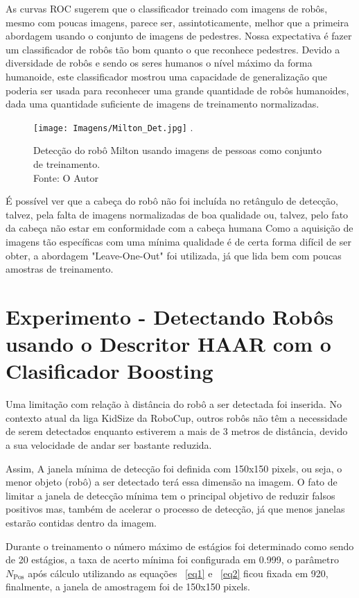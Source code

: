 As curvas ROC sugerem que o classificador treinado com imagens de robôs, mesmo com poucas imagens, parece ser, assintoticamente, melhor que a primeira abordagem usando o conjunto de imagens de pedestres. Nossa expectativa é fazer um classificador de robôs tão bom quanto o que reconhece pedestres. Devido a diversidade de robôs e sendo os seres humanos o nível máximo da forma humanoide, este classificador mostrou uma capacidade de generalização que poderia ser usada para reconhecer uma grande quantidade de robôs humanoides, dada uma quantidade suficiente de imagens de treinamento normalizadas.

\begin{figure}[!hH]
\centering
\texttt{[image: Imagens/Milton\_Det.jpg]}
\DeclareGraphicsExtensions.
\caption{Detecção do robô Milton usando imagens de pessoas como conjunto de treinamento. \\ Fonte: O Autor}
\label{Fig:Miltondet}
\end{figure} 

É possível ver que a cabeça do robô não foi incluída no retângulo de detecção, talvez, pela falta de imagens normalizadas de boa qualidade ou, talvez, pelo fato da cabeça não estar em conformidade com a cabeça humana
Como a aquisição de imagens tão específicas com uma mínima qualidade é de certa forma difícil de ser obter, a abordagem "Leave-One-Out" foi utilizada, já que lida bem com poucas amostras de treinamento.


\pagebreak

\section{Experimento - Detectando Robôs usando o Descritor HAAR com o Clasificador Boosting}
\label{HAAR-Boosting}
Uma limitação com relação à distância do robô a ser detectada foi inserida. No contexto atual da liga KidSize da RoboCup, outros robôs não têm a necessidade de serem detectados enquanto estiverem a mais de 3 metros de distância, devido a sua velocidade de andar ser bastante reduzida. 

Assim, A janela mínima de detecção foi definida com 150x150 pixels, ou seja, o menor objeto (robô) a ser detectado terá essa dimensão na imagem. O fato de limitar a janela de detecção mínima tem o principal objetivo de reduzir falsos positivos mas, também de acelerar o processo de detecção, já que menos janelas estarão contidas dentro da imagem. 

Durante o treinamento o número máximo de estágios foi determinado como sendo de 20 estágios, a taxa de acerto mínima foi configurada em 0.999, o parâmetro \(N_{\text{Pos}}\) após cálculo utilizando as equações ~\ref{eq1} e ~\ref{eq2} ficou fixada em 920, finalmente, a janela de amostragem foi de 150x150 pixels.

